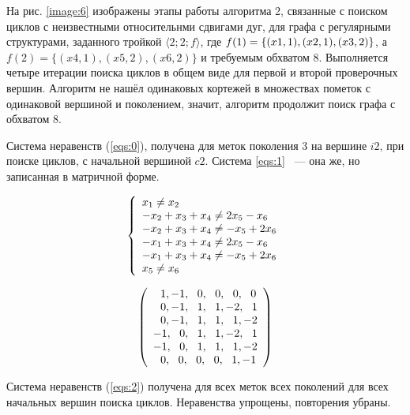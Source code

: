 \documentclass[14pt]{mmcs-article}
\begin{document}
На рис. \ref{image:6} изображены этапы работы алгоритма 2, связанные с поиском циклов с неизвестными относительнми сдвигами дуг, для графа с регулярными структурами, заданного тройкой $ \langle 2; 2; f\rangle $, где $ f(1) = \{ (x1, 1),\\ (x2, 1), (x3, 2) \} $, а $f(2) = \{ (x4, 1), (x5, 2), (x6, 2) \}$ и требуемым обхватом 8. Выполняется четыре итерации поиска циклов в общем виде для первой и второй проверочных вершин. Алгоритм не нашёл одинаковых кортежей в множествах пометок с одинаковой вершиной и поколением, значит, алгоритм продолжит поиск графа с обхватом 8.

Система неравенств (\ref{eqs:0}), получена для меток поколения $3$ на вершине $i2$, при поиске циклов, с начальной вершиной $c2$. Система \ref{eqs:1} ~--- она же, но записанная в матричной форме.

\begin{equation}
    \centering
    \left\{
        \begin{array}{ll}
            x_1 \neq x_2\\
            -x_2 + x_3 + x_4 \neq 2 x_5 - x_6\\
            -x_2 + x_3 + x_4 \neq -x_5 + 2 x_6\\
            -x_1 + x_3 + x_4 \neq 2 x_5 - x_6\\
            -x_1 + x_3 + x_4 \neq -x_5 + 2 x_6\\
            x_5 \neq x_6\\
        \end{array}
    \right.
    \label{eqs:0}
\end{equation}

\begin{equation}
    \centering
    \left(
        \begin{array}{ll}
            \ \ 1,-1,\ \ 0,\ \ 0,\ \ 0,\ \ 0\\
            \ \ 0,-1,\ \ 1,\ \ 1,-2,\ \ 1\\
            \ \ 0,-1,\ \ 1,\ \ 1,\ \ 1,-2\\
            -1,\ \ 0,\ \ 1,\ \ 1,-2,\ \ 1\\
            -1,\ \ 0,\ \ 1,\ \ 1,\ \ 1,-2\\
            \ \ 0,\ \ 0,\ \ 0,\ \ 0,\ \ 1,-1\\
        \end{array}
    \right)
    \label{eqs:1}
\end{equation}

Система неравенств (\ref{eqs:2}) получена для всех меток всех поколений для всех начальных вершин поиска циклов. Неравенства упрощены, повторения убраны.
\end{document}
